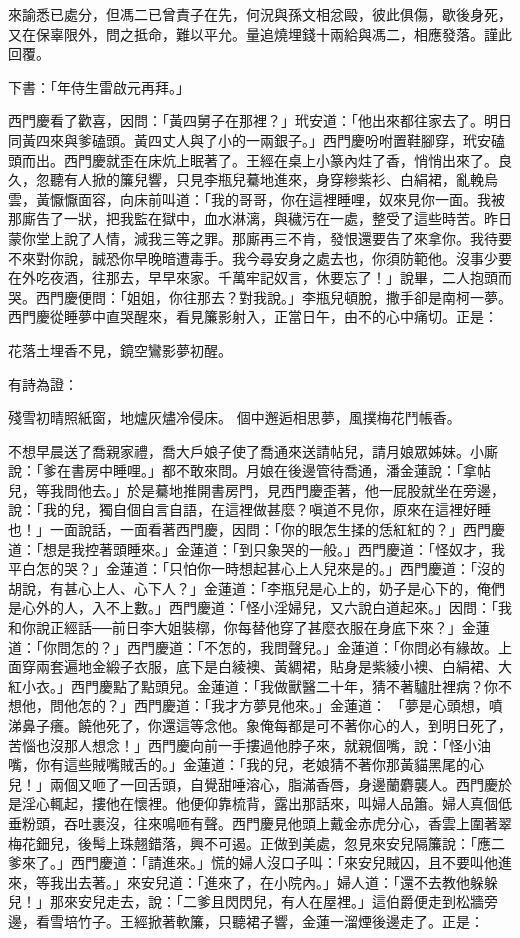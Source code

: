 來諭悉已處分，但馮二已曾責子在先，何況與孫文相忿毆，彼此俱傷，歇後身死，又在保辜限外，問之抵命，難以平允。量追燒埋錢十兩給與馮二，相應發落。謹此回覆。

下書：「年侍生雷啟元再拜。」

西門慶看了歡喜，因問：「黃四舅子在那裡？」玳安道：「他出來都往家去了。明日同黃四來與爹磕頭。黃四丈人與了小的一兩銀子。」西門慶吩咐置鞋腳穿，玳安磕頭而出。西門慶就歪在床炕上眠著了。王經在桌上小篆內炷了香，悄悄出來了。良久，忽聽有人掀的簾兒響，只見李瓶兒驀地進來，身穿糝紫衫、白絹裙，亂輓烏雲，黃懨懨面容，向床前叫道：「我的哥哥，你在這裡睡哩，奴來見你一面。我被那廝告了一狀，把我監在獄中，血水淋漓，與穢污在一處，整受了這些時苦。昨日蒙你堂上說了人情，減我三等之罪。那廝再三不肯，發恨還要告了來拿你。我待要不來對你說，誠恐你早晚暗遭毒手。我今尋安身之處去也，你須防範他。沒事少要在外吃夜酒，往那去，早早來家。千萬牢記奴言，休要忘了！」說畢，二人抱頭而哭。西門慶便問：「姐姐，你往那去？對我說。」李瓶兒頓脫，撒手卻是南柯一夢。西門慶從睡夢中直哭醒來，看見簾影射入，正當日午，由不的心中痛切。正是：

花落土埋香不見，鏡空鸞影夢初醒。

有詩為證：

殘雪初晴照紙窗，地爐灰燼冷侵床。
個中邂逅相思夢，風撲梅花鬥帳香。

不想早晨送了喬親家禮，喬大戶娘子使了喬通來送請帖兒，請月娘眾姊妹。小廝說：「爹在書房中睡哩。」都不敢來問。月娘在後邊管待喬通，潘金蓮說：「拿帖兒，等我問他去。」於是驀地推開書房門，見西門慶歪著，他一屁股就坐在旁邊，說：「我的兒，獨自個自言自語，在這裡做甚麼？嗔道不見你，原來在這裡好睡也！」一面說話，一面看著西門慶，因問：「你的眼怎生揉的恁紅紅的？」西門慶道：「想是我控著頭睡來。」金蓮道：「到只象哭的一般。」西門慶道：「怪奴才，我平白怎的哭？」金蓮道：「只怕你一時想起甚心上人兒來是的。」西門慶道：「沒的胡說，有甚心上人、心下人？」金蓮道：「李瓶兒是心上的，奶子是心下的，俺們是心外的人，入不上數。」西門慶道：「怪小淫婦兒，又六說白道起來。」因問：「我和你說正經話──前日李大姐裝槨，你每替他穿了甚麼衣服在身底下來？」金蓮道：「你問怎的？」西門慶道：「不怎的，我問聲兒。」金蓮道：「你問必有緣故。上面穿兩套遍地金緞子衣服，底下是白綾襖、黃綢裙，貼身是紫綾小襖、白絹裙、大紅小衣。」西門慶點了點頭兒。金蓮道：「我做獸醫二十年，猜不著驢肚裡病？你不想他，問他怎的？」西門慶道：「我才方夢見他來。」金蓮道： 「夢是心頭想，噴涕鼻子癢。饒他死了，你還這等念他。象俺每都是可不著你心的人，到明日死了，苦惱也沒那人想念！」西門慶向前一手摟過他脖子來，就親個嘴，說：「怪小油嘴，你有這些賊嘴賊舌的。」金蓮道：「我的兒，老娘猜不著你那黃貓黑尾的心兒！」兩個又咂了一回舌頭，自覺甜唾溶心，脂滿香唇，身邊蘭麝襲人。西門慶於是淫心輒起，摟他在懷裡。他便仰靠梳背，露出那話來，叫婦人品簫。婦人真個低垂粉頭，吞吐裹沒，往來鳴咂有聲。西門慶見他頭上戴金赤虎分心，香雲上圍著翠梅花鈿兒，後髩上珠翹錯落，興不可遏。正做到美處，忽見來安兒隔簾說：「應二爹來了。」西門慶道：「請進來。」慌的婦人沒口子叫：「來安兒賊囚，且不要叫他進來，等我出去著。」來安兒道：「進來了，在小院內。」婦人道：「還不去教他躲躲兒！」那來安兒走去，說：「二爹且閃閃兒，有人在屋裡。」這伯爵便走到松牆旁邊，看雪培竹子。王經掀著軟簾，只聽裙子響，金蓮一溜煙後邊走了。正是：

